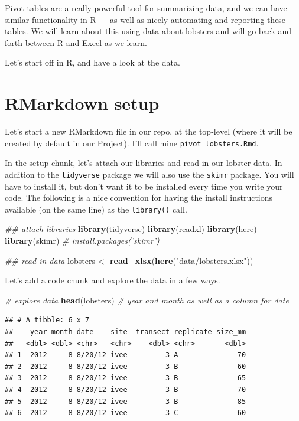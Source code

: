 \documentclass[]{book}
\newenvironment{Shaded}{\begin{snugshade}}{\end{snugshade}}
\newcommand{\CommentTok}[1]{\textcolor[rgb]{0.56,0.35,0.01}{\textit{#1}}}
\newcommand{\KeywordTok}[1]{\textcolor[rgb]{0.13,0.29,0.53}{\textbf{#1}}}
\newcommand{\NormalTok}[1]{#1}
\newcommand{\StringTok}[1]{\textcolor[rgb]{0.31,0.60,0.02}{#1}}
\begin{document}
Pivot tables are a really powerful tool for summarizing data, and we can have similar functionality in R --- as well as nicely automating and reporting these tables. We will learn about this using data about lobsters and will go back and forth between R and Excel as we learn.

Let's start off in R, and have a look at the data.

\hypertarget{rmarkdown-setup}{%
\section{RMarkdown setup}\label{rmarkdown-setup}}

Let's start a new RMarkdown file in our repo, at the top-level (where it will be created by default in our Project). I'll call mine \texttt{pivot\_lobsters.Rmd}.

In the setup chunk, let's attach our libraries and read in our lobster data. In addition to the \texttt{tidyverse} package we will also use the \texttt{skimr} package. You will have to install it, but don't want it to be installed every time you write your code. The following is a nice convention for having the install instructions available (on the same line) as the \texttt{library()} call.

\begin{Shaded}
\begin{Highlighting}[]
\CommentTok{## attach libraries}
\KeywordTok{library}\NormalTok{(tidyverse)}
\KeywordTok{library}\NormalTok{(readxl)}
\KeywordTok{library}\NormalTok{(here)}
\KeywordTok{library}\NormalTok{(skimr) }\CommentTok{# install.packages('skimr')}

\CommentTok{## read in data}
\NormalTok{lobsters <-}\StringTok{ }\KeywordTok{read_xlsx}\NormalTok{(}\KeywordTok{here}\NormalTok{(}\StringTok{"data/lobsters.xlsx"}\NormalTok{))}
\end{Highlighting}
\end{Shaded}

Let's add a code chunk and explore the data in a few ways.

\begin{Shaded}
\begin{Highlighting}[]
\CommentTok{# explore data}
\KeywordTok{head}\NormalTok{(lobsters) }\CommentTok{# year and month as well as a column for date}
\end{Highlighting}
\end{Shaded}

\begin{verbatim}
## # A tibble: 6 x 7
##    year month date    site  transect replicate size_mm
##   <dbl> <dbl> <chr>   <chr>    <dbl> <chr>       <dbl>
## 1  2012     8 8/20/12 ivee         3 A              70
## 2  2012     8 8/20/12 ivee         3 B              60
## 3  2012     8 8/20/12 ivee         3 B              65
## 4  2012     8 8/20/12 ivee         3 B              70
## 5  2012     8 8/20/12 ivee         3 B              85
## 6  2012     8 8/20/12 ivee         3 C              60
\end{verbatim}
\end{document}
